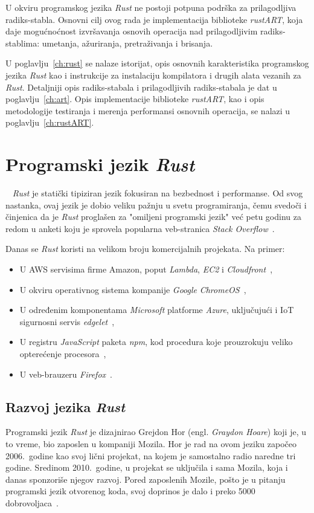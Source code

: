 \documentclass[12pt,oneside]{memoir}
\begin{document}
U okviru programskog jezika \textit{Rust} ne postoji potpuna podrška za
prilagodljiva radiks-stabla. Osnovni cilj ovog rada je implementacija
biblioteke \textit{rustART}, koja daje mogućnoćnost izvršavanja osnovih operacija
nad prilagodljivim radiks-stablima: umetanja, ažuriranja, pretraživanja i brisanja.

U poglavlju~\ref{ch:rust} se nalaze istorijat, opis
osnovnih karakteristika programskog jezika \textit{Rust} kao i instrukcije
za instalaciju kompilatora i drugih alata vezanih za \textit{Rust}.
Detaljniji opis radiks-stabala i
prilagodljivih radiks-stabala je dat u poglavlju~\ref{ch:art}.
Opis implementacije biblioteke \textit{rustART}, kao i opis metodologije
testiranja i merenja performansi osnovnih operacija,
se nalazi u poglavlju~\ref{ch:rustART}.

\chapter{Programski jezik \emph{Rust}}~\label{ch:rust}
\emph{Rust} je statički tipiziran jezik  fokusiran na bezbednost i
performanse. Od svog nastanka, ovaj jezik
je dobio veliku pažnju u svetu programiranja, čemu svedoči i činjenica da je
\emph{Rust} proglašen za "omiljeni programski jezik" već petu godinu za redom
u anketi koju je sprovela popularna veb-stranica \emph{Stack Overflow}~\cite{mostloved_so}.

Danas se \emph{Rust} koristi na velikom broju komercijalnih projekata. Na primer:

\begin{itemize}
    \item U AWS servisima firme Amazon, poput \emph{Lambda}, \emph{EC2}
        i \emph{Cloudfront}~\cite{aws},
    \item U okviru operativnog sistema kompanije \textit{Google}
        \emph{ChromeOS}~\cite{crosvm},
    \item U određenim komponentama \textit{Microsoft} platforme \emph{Azure}, uključujući i
        IoT sigurnosni servis \emph{edgelet}~\cite{edgelet},
    \item U registru \emph{JavaScript} paketa \emph{npm},
        kod procedura koje prouzrokuju veliko opterećenje procesora~\cite{npm},
    \item U veb-brauzeru \textit{Firefox}~\cite{firefox_rust}.
\end{itemize}

\section{Razvoj jezika \emph{Rust}}
Programski jezik \emph{Rust} je dizajnirao Grejdon Hor
(engl. \emph{Graydon Hoare}) koji je, u to vreme, bio zaposlen u kompaniji
Mozila.
Hor je rad na ovom jeziku započeo 2006.\ godine kao svoj lični projekat,
na kojem je samostalno radio naredne tri godine.
Sredinom 2010.\ godine, u projekat se
uključila i sama Mozila, koja i danas sponzoriše njegov razvoj.
Pored zaposlenih Mozile, pošto je u pitanju programski jezik otvorenog koda,
svoj doprinos je dalo i preko 5000 dobrovoljaca~\cite{thanks_rust}.
\end{document}
